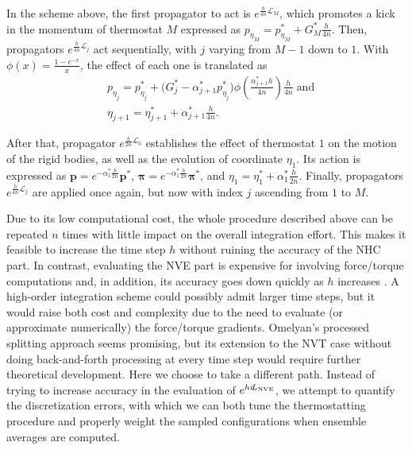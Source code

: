 \documentclass[
	aip,
	jcp,
	reprint,
]{revtex4-1}
\newcommand{\vt}[1]{\boldsymbol{\mathbf{#1}}}          %
\newcommand{\Liu}[1]{i\!L_\text{#1}}                   %
\newcommand{\timestep}{h}
\begin{document}
In the scheme above, the first propagator to act is $e^{\frac{\timestep}{4n} \mathcal{L}_M}$, which promotes a kick in the momentum of thermostat $M$ expressed as $p_{\eta_M} = p_{\eta_M}^\ast + G_M^\ast \frac{\timestep}{4n}$.
Then, propagators $e^{\frac{\timestep}{4n} \mathcal{L}_j}$ act sequentially, with $j$ varying from $M-1$ down to $1$.
With $\phi(x) = \frac{1-e^{-x}}{x}$, the effect of each one is translated as \cite{Martyna_1996}
\begin{align*}
&p_{\eta_j} = p_{\eta_j}^\ast + \Big( G_j^\ast - \alpha_{j+1}^\ast p_{\eta_j}^\ast \Big) \phi\left(\frac{\alpha_{j+1}^\ast \timestep}{4n}\right) \frac{\timestep}{4n} \; \text{and} \\
&\eta_{j+1} = \eta_{j+1}^\ast + \alpha_{j+1}^\ast \frac{\timestep}{4n}.
\end{align*}

After that, propagator $e^{\frac{\timestep}{2n} \mathcal{L}_0}$ establishes the effect of thermostat $1$ on the motion of the rigid bodies, as well as the evolution of coordinate $\eta_1$.
Its action is expressed as ${\vt p} = e^{-\alpha_1^\ast \frac{\timestep}{2n}} {\vt p}^\ast$, ${\vt \pi} = e^{-\alpha_1^\ast \frac{\timestep}{2n}} {\vt \pi}^\ast$, and $\eta_1 = \eta_1^\ast + \alpha_1^\ast \frac{\timestep}{2n}$.
Finally, propagators $e^{\frac{\timestep}{4n} \mathcal{L}_j}$ are applied once again, but now with index $j$ ascending from $1$ to $M$.

Due to its low computational cost, the whole procedure described above can be repeated $n$ times with little impact on the overall integration effort.
This makes it feasible to increase the time step $\timestep$ without ruining the accuracy of the NHC part.
In contrast, evaluating the NVE part is expensive for involving force/torque computations and, in addition, its accuracy goes down quickly as $\timestep$ increases \cite{Davidchack_2010, Silveira_2017}.
A high-order integration scheme\cite{Omelyan_2007, Van_zon_2008} could possibly admit larger time steps, but it would raise both cost and complexity due to the need to evaluate (or approximate numerically) the force/torque gradients.
Omelyan's processed splitting approach \cite{Omelyan_2008} seems promising, but its extension to the NVT case without doing back-and-forth processing at every time step would require further theoretical development.
Here we choose to take a different path.
Instead of trying to increase accuracy in the evaluation of $e^{\timestep \Liu{\tiny NVE}}$, we attempt to quantify the discretization errors, with which we can both tune the thermostatting procedure and properly weight the sampled configurations when ensemble averages are computed.
\end{document}
